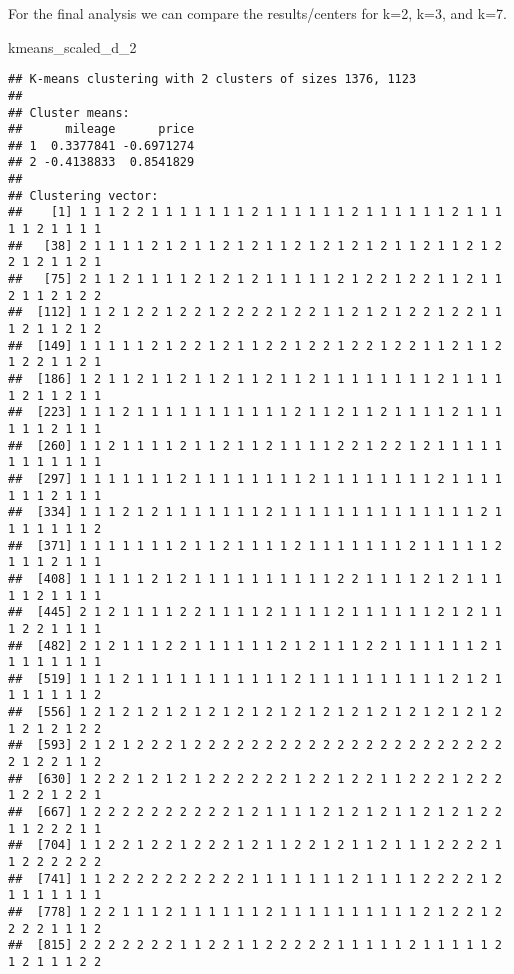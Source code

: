 \documentclass[
]{article}
\newenvironment{Shaded}{\begin{snugshade}}{\end{snugshade}}
\newcommand{\NormalTok}[1]{#1}
\begin{document}
For the final analysis we can compare the results/centers for k=2, k=3,
and k=7.

\begin{Shaded}
\begin{Highlighting}[]
\NormalTok{kmeans\_scaled\_d\_2}
\end{Highlighting}
\end{Shaded}

\begin{verbatim}
## K-means clustering with 2 clusters of sizes 1376, 1123
## 
## Cluster means:
##      mileage      price
## 1  0.3377841 -0.6971274
## 2 -0.4138833  0.8541829
## 
## Clustering vector:
##    [1] 1 1 1 2 2 1 1 1 1 1 1 1 2 1 1 1 1 1 1 2 1 1 1 1 1 1 2 1 1 1 1 1 2 1 1 1 1
##   [38] 2 1 1 1 1 2 1 2 1 1 2 1 2 1 1 2 1 2 1 2 1 2 1 1 2 1 1 2 1 2 2 1 2 1 1 2 1
##   [75] 2 1 1 2 1 1 1 1 2 1 2 1 2 1 1 1 1 1 2 1 2 2 1 2 2 1 1 2 1 1 2 1 1 2 1 2 2
##  [112] 1 1 2 1 2 2 1 2 2 1 2 2 2 2 1 2 2 1 1 2 1 2 1 2 2 1 2 2 1 1 1 2 1 1 2 1 2
##  [149] 1 1 1 1 1 2 1 2 2 1 2 1 1 2 2 1 2 2 1 2 2 1 2 2 1 1 2 1 1 2 1 2 2 1 1 2 1
##  [186] 1 2 1 1 2 1 1 2 1 1 2 1 1 2 1 1 2 1 1 1 1 1 1 1 1 2 1 1 1 1 1 2 1 1 2 1 1
##  [223] 1 1 1 2 1 1 1 1 1 1 1 1 1 1 1 2 1 1 2 1 1 2 1 1 1 1 2 1 1 1 1 1 1 2 1 1 1
##  [260] 1 1 2 1 1 1 1 2 1 1 2 1 1 2 1 1 1 1 2 2 1 2 2 1 2 1 1 1 1 1 1 1 1 1 1 1 1
##  [297] 1 1 1 1 1 1 1 2 1 1 1 1 1 1 1 1 2 1 1 1 1 1 1 1 1 2 1 1 1 1 1 1 1 2 1 1 1
##  [334] 1 1 1 2 1 2 1 1 1 1 1 1 1 2 1 1 1 1 1 1 1 1 1 1 1 1 1 1 2 1 1 1 1 1 1 1 2
##  [371] 1 1 1 1 1 1 1 2 1 1 2 1 1 1 1 2 1 1 1 1 1 1 1 2 1 1 1 1 1 2 1 1 1 2 1 1 1
##  [408] 1 1 1 1 1 2 1 2 1 1 1 1 1 1 1 1 1 1 2 2 1 1 1 1 2 1 2 1 1 1 1 1 2 1 1 1 1
##  [445] 2 1 2 1 1 1 1 2 2 1 1 1 1 2 1 1 1 1 2 1 1 1 1 1 1 2 1 2 1 1 1 2 2 1 1 1 1
##  [482] 2 1 2 1 1 1 2 2 1 1 1 1 1 1 2 1 2 1 1 1 2 2 1 1 1 1 1 1 2 1 1 1 1 1 1 1 1
##  [519] 1 1 1 2 1 1 1 1 1 1 1 1 1 1 1 2 1 1 1 1 1 1 1 1 1 1 2 1 2 1 1 1 1 1 1 1 2
##  [556] 1 2 1 2 1 2 1 2 1 2 1 2 1 2 1 2 1 2 1 2 1 2 1 2 1 2 1 2 1 2 1 2 1 2 1 2 2
##  [593] 2 1 2 1 2 2 2 1 2 2 2 2 2 2 2 2 2 2 2 2 2 2 2 2 2 2 2 2 2 2 2 1 2 2 1 1 2
##  [630] 1 2 2 2 1 2 1 2 1 2 2 2 2 2 2 1 2 2 1 2 2 1 1 2 2 2 1 2 2 2 1 2 2 1 2 2 1
##  [667] 1 2 2 2 2 2 2 2 2 2 2 1 2 1 1 1 1 2 1 2 1 2 1 1 2 1 2 1 2 2 1 1 2 2 2 1 1
##  [704] 1 1 2 2 1 2 2 1 2 2 2 1 2 1 1 2 2 1 2 1 1 2 1 1 1 2 2 2 2 1 1 2 2 2 2 2 2
##  [741] 1 1 2 2 2 2 2 2 2 2 2 2 1 1 1 1 1 1 1 2 1 1 1 1 2 2 2 2 1 2 1 1 1 1 1 1 1
##  [778] 1 2 2 1 1 1 2 1 1 1 1 1 1 2 1 1 1 1 1 1 1 1 1 1 2 1 2 2 1 2 2 2 2 1 1 1 2
##  [815] 2 2 2 2 2 2 2 1 1 2 2 1 1 2 2 2 2 2 1 1 1 1 1 2 1 1 1 1 1 2 1 2 1 1 1 2 2

\end{verbatim}
\end{document}
